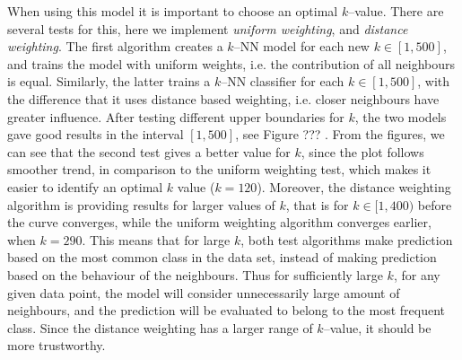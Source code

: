     When using this model it is important to choose an optimal $k$--value. There are several tests for this, here we implement \emph{uniform weighting}, and \emph{distance weighting}. The first algorithm creates a $k$--NN model for each new $k \in [1, 500]$, and trains the model with uniform weights, i.e. the contribution of all neighbours is equal. Similarly, the latter trains a $k$--NN classifier for each $k \in [1, 500]$, with the difference that it uses distance based weighting, i.e. closer neighbours have greater influence. After testing different upper boundaries for $k$, the two models gave good results in the interval $[1,500]$, see Figure ??? . From the figures, we can see that the second test gives a better value for $k$, since the plot follows smoother trend, in comparison to the uniform weighting test, which makes it easier to identify an optimal $k$ value ($k = 120$). Moreover, the distance weighting algorithm is providing results for larger values of $k$, that is for $k \in [1, 400)$ before the curve converges, while the uniform weighting algorithm converges earlier, when $k = 290$. This means that for large $k$, both test algorithms make prediction based on the most common class in the data set, instead of making prediction based on the behaviour of the neighbours. Thus for sufficiently large $k$, for any given data point, the model will consider unnecessarily large amount of neighbours, and the prediction will be evaluated to belong to the most frequent class. Since the distance weighting has a larger range of $k$--value, it should be more trustworthy.
    

